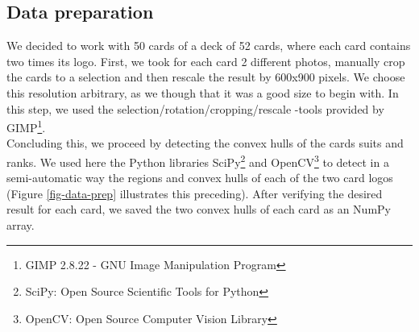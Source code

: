 \documentclass[a4paper]{article}
\begin{document}
\subsection{Data preparation}
We decided to work with 50 cards of a deck of 52 cards, where each card contains two times its logo.  First, we took for each card 2 different photos, manually crop the cards to a selection and then rescale the result by 600x900 pixels.  We choose this resolution arbitrary, as we though that it was a good size to begin with.
In this step, we used the selection/rotation/cropping/rescale -tools provided by GIMP\footnote{GIMP 2.8.22 - GNU Image Manipulation Program}. \\
Concluding this, we proceed by detecting the convex hulls of the cards suits and ranks.   We used here the Python libraries SciPy\footnote{SciPy: Open Source Scientific Tools for Python} and OpenCV\footnote{OpenCV: Open Source Computer Vision Library} to detect in a semi-automatic way the regions and convex hulls of each of the two card logos (Figure \ref{fig-data-prep} illustrates this preceding).  After verifying the desired result for each card, we saved the two convex hulls of each card as an NumPy array. \\
\end{document}
